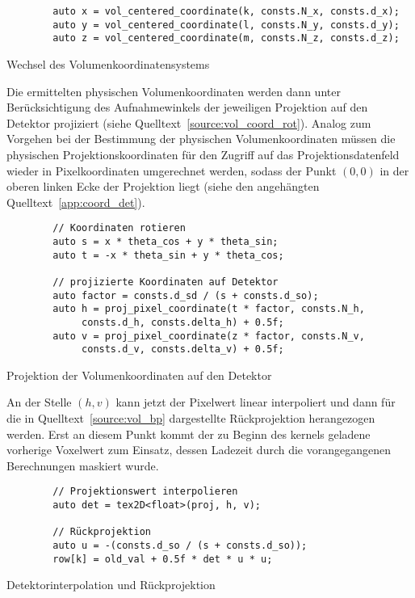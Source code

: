 \begin{listing}
\begin{verbatim}
        auto x = vol_centered_coordinate(k, consts.N_x, consts.d_x);
        auto y = vol_centered_coordinate(l, consts.N_y, consts.d_y);
        auto z = vol_centered_coordinate(m, consts.N_z, consts.d_z);
\end{verbatim}
\caption{Wechsel des Volumenkoordinatensystems}
\label{source:vol_coord_switch}
\end{listing}

Die ermittelten physischen Volumenkoordinaten werden dann unter Berücksichtigung des Aufnahmewinkels der jeweiligen
Projektion auf den Detektor projiziert (siehe Quelltext~\ref{source:vol_coord_rot}). Analog zum Vorgehen bei der
Bestimmung der physischen Volumenkoordinaten müssen die physischen Projektionskoordinaten für den Zugriff auf das
Projektionsdatenfeld wieder in Pixelkoordinaten umgerechnet werden, sodass der Punkt $(0, 0)$ in der oberen linken Ecke
der Projektion liegt (siehe den angehängten Quelltext~\ref{app:coord_det}).

\begin{listing}
\begin{verbatim}
        // Koordinaten rotieren
        auto s = x * theta_cos + y * theta_sin;
        auto t = -x * theta_sin + y * theta_cos;

        // projizierte Koordinaten auf Detektor
        auto factor = consts.d_sd / (s + consts.d_so);
        auto h = proj_pixel_coordinate(t * factor, consts.N_h,
             consts.d_h, consts.delta_h) + 0.5f;
        auto v = proj_pixel_coordinate(z * factor, consts.N_v,
             consts.d_v, consts.delta_v) + 0.5f;
\end{verbatim}
\caption{Projektion der Volumenkoordinaten auf den Detektor}
\label{source:vol_coord_rot}
\end{listing}

An der Stelle $(h, v)$ kann jetzt der Pixelwert linear interpoliert und dann für die in Quelltext~\ref{source:vol_bp}
dargestellte Rückprojektion herangezogen werden. Erst an diesem Punkt kommt der zu Beginn des \gls{kernel}s geladene
vorherige Voxelwert zum Einsatz, dessen Ladezeit durch die vorangegangenen Berechnungen maskiert wurde.

\begin{listing}
\begin{verbatim}
        // Projektionswert interpolieren
        auto det = tex2D<float>(proj, h, v);

        // Rückprojektion
        auto u = -(consts.d_so / (s + consts.d_so));
        row[k] = old_val + 0.5f * det * u * u;
\end{verbatim}
\caption{Detektorinterpolation und Rückprojektion}
\label{source:vol_bp}
\end{listing}

